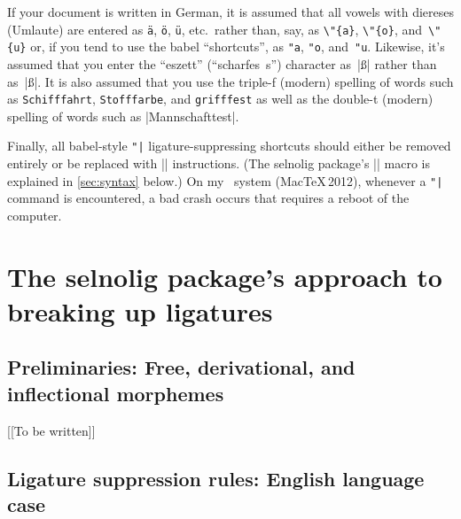 \documentclass[11pt]{article}
\newcommand{\pkg}[1]{\textsf{#1}}
\newcommand{\opt}[1]{\texttt{#1}}
\newcommand{\cmmd}[1]{\texttt{\textbackslash #1}}
\begin{document}
If your document is written in German, it is assumed that all vowels with diereses (Umlaute) are entered as \Verb|ä|, \Verb|ö|, \Verb|ü|, etc.\ rather than, say, as \Verb|\"{a}|, \Verb|\"{o}|, and~\Verb|\"{u}| or, if you tend to use the \pkg{babel} \enquote{shortcuts}, as \Verb|"a|, \Verb|"o|, and~\Verb|"u|. Likewise, it's assumed that you enter the \enquote{eszett} (\enquote{scharfes~s}) character as~|ß| rather than as~|\ss|.
It is also assumed that you use the triple-f (modern) spelling of words such as \texttt{Schifffahrt}, \texttt{Stofffarbe}, and \texttt{grifffest} as well as the double-t (modern) spelling of words such as |Mannschafttest|.

Finally, all \pkg{babel}-style \Verb+"|+ ligature-suppressing shortcuts should either be removed entirely or be replaced with |\breaklig| instructions. (The \pkg{selnolig} package's |\breaklig| macro is explained in \cref{sec:syntax} below.) On my \LuaLaTeX\ system (MacTeX\,2012), whenever a \Verb+"|+ command is encountered, a bad crash occurs that requires a reboot of the computer.





\section[The selnolig package's approach to breaking up ligatures]{The \pkg{selnolig} package's approach to breaking up ligatures}

\subsection{Preliminaries: Free, derivational, and inflectional morphemes}

[[To be written]]


%

\subsection{Ligature suppression rules: English language case}
\end{document}
